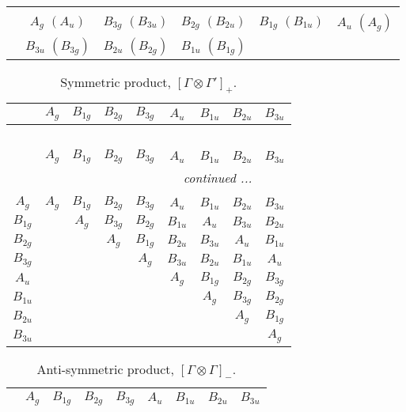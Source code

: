 \documentclass[fleqn,10pt,landscape]{article}
\begin{document}
\begin{itemize}
\begin{center}
\begin{longtable}{cccccc}
 \hline \hline
\multicolumn{5}{r}{} \\ \endlastfoot

 & $ A_{g}\,\,(A_{u}) $ & $ B_{3g}\,\,(B_{3u}) $ & $ B_{2g}\,\,(B_{2u}) $ & $ B_{1g}\,\,(B_{1u}) $ & $ A_{u}\,\,(A_{g}) $ \\
& $ B_{3u}\,\,(B_{3g}) $ & $ B_{2u}\,\,(B_{2g}) $ & $ B_{1u}\,\,(B_{1g}) $ & $  $ & $  $ \\
\end{longtable}
\end{center}
\begin{center}
\renewcommand{\arraystretch}{1.0}
\begin{longtable}{c|cccccccc}
\caption{Symmetric product, $[\Gamma\otimes\Gamma']_+.$}
 \\
 \hline \hline
 & $ A_{g} $ & $ B_{1g} $ & $ B_{2g} $ & $ B_{3g} $ & $ A_{u} $ & $ B_{1u} $ & $ B_{2u} $ & $ B_{3u} $ \\ \hline \endfirsthead

\multicolumn{8}{l}{\tablename\ \thetable{}} \\
 \hline \hline
 & $ A_{g} $ & $ B_{1g} $ & $ B_{2g} $ & $ B_{3g} $ & $ A_{u} $ & $ B_{1u} $ & $ B_{2u} $ & $ B_{3u} $ \\ \hline \endhead

 \hline \hline
\multicolumn{8}{r}{\footnotesize\it continued ...} \\ \endfoot

 \hline \hline
\multicolumn{8}{r}{} \\ \endlastfoot

$ A_{g} $ & $ A_{g} $ & $ B_{1g} $ & $ B_{2g} $ & $ B_{3g} $ & $ A_{u} $ & $ B_{1u} $ & $ B_{2u} $ & $ B_{3u} $ \\
$ B_{1g} $ & $  $ & $ A_{g} $ & $ B_{3g} $ & $ B_{2g} $ & $ B_{1u} $ & $ A_{u} $ & $ B_{3u} $ & $ B_{2u} $ \\
$ B_{2g} $ & $  $ & $  $ & $ A_{g} $ & $ B_{1g} $ & $ B_{2u} $ & $ B_{3u} $ & $ A_{u} $ & $ B_{1u} $ \\
$ B_{3g} $ & $  $ & $  $ & $  $ & $ A_{g} $ & $ B_{3u} $ & $ B_{2u} $ & $ B_{1u} $ & $ A_{u} $ \\
$ A_{u} $ & $  $ & $  $ & $  $ & $  $ & $ A_{g} $ & $ B_{1g} $ & $ B_{2g} $ & $ B_{3g} $ \\
$ B_{1u} $ & $  $ & $  $ & $  $ & $  $ & $  $ & $ A_{g} $ & $ B_{3g} $ & $ B_{2g} $ \\
$ B_{2u} $ & $  $ & $  $ & $  $ & $  $ & $  $ & $  $ & $ A_{g} $ & $ B_{1g} $ \\
$ B_{3u} $ & $  $ & $  $ & $  $ & $  $ & $  $ & $  $ & $  $ & $ A_{g} $ \\
\end{longtable}
\end{center}
\begin{center}
\renewcommand{\arraystretch}{1.0}
\begin{longtable}{ccccccccc}
\caption{Anti-symmetric product, $[\Gamma\otimes\Gamma]_-$.}
 \\
 \hline \hline
 & $ A_{g} $ & $ B_{1g} $ & $ B_{2g} $ & $ B_{3g} $ & $ A_{u} $ & $ B_{1u} $ & $ B_{2u} $ & $ B_{3u} $ \\ \hline \endfirsthead


\end{longtable}
\end{center}
\end{itemize}
\end{document}
